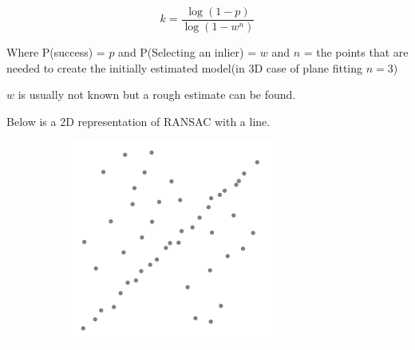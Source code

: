 				\begin{equation}
					k = \frac{\log(1-p)}{\log(1- w^n)}
				\end{equation}
				
				Where P(success) = $p$ and P(Selecting an inlier) = $w$ and $n$ = the points that are needed to create the initially estimated model(in 3D case of plane fitting $n = 3$)
				
				$w$ is usually not known but a rough estimate can be found.
				
				Below is a 2D representation of RANSAC with a line.
			
				\begin{figure}[H]
					\centering
					\begin{subfigure}{.5\textwidth}
						\centering
						\includegraphics[width=1\linewidth]{Includes/images/random_sample_example1}
						\label{fig:RANSAC1}
					\end{subfigure}%
					\begin{subfigure}{.5\textwidth}
						\centering

\end{subfigure}
\end{figure}
